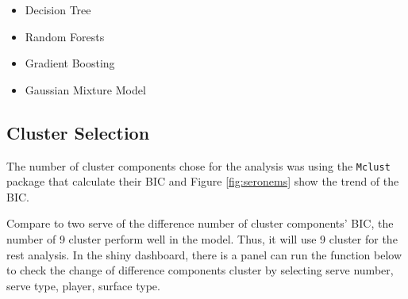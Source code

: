 \documentclass[11pt,a4paper,]{article}
\begin{document}
\begin{itemize}
\item
  Decision Tree
\item
  Random Forests
\item
  Gradient Boosting
\item
  Gaussian Mixture Model
\end{itemize}

\hypertarget{cluster-selection}{%
\subsection{Cluster Selection}\label{cluster-selection}}

The number of cluster components chose for the analysis was using the \texttt{Mclust} package that calculate their BIC and Figure \ref{fig:seronems} show the trend of the BIC.

Compare to two serve of the difference number of cluster components' BIC, the number of 9 cluster perform well in the model. Thus, it will use 9 cluster for the rest analysis. In the shiny dashboard, there is a panel can run the function below to check the change of difference components cluster by selecting serve number, serve type, player, surface type.
\end{document}
